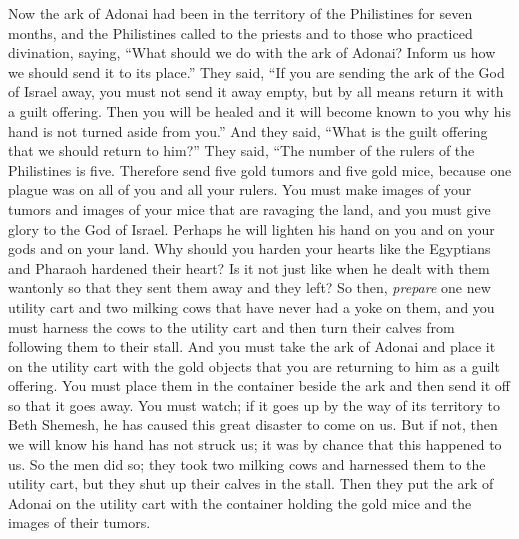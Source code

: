 \begin{biblechapter} %
 Now the ark of Adonai had been in the territory of the Philistines for seven months,
\verse and the Philistines called to the priests and to those who practiced divination, saying, “What should we do with the ark of Adonai? Inform us how we should send it to its place.”
\verse They said, “If you are sending the ark of the God of Israel away, you must not send it away empty, but by all means return it with a guilt offering. Then you will be healed and it will become known to you why his hand is not turned aside from you.”
\verse And they said, “What is the guilt offering that we should return to him?” They said, “The number of the rulers of the Philistines is five. Therefore send five gold tumors and five gold mice, because one plague was on all of you and all your rulers.
\verse You must make images of your tumors and images of your mice that are ravaging the land, and you must give glory to the God of Israel. Perhaps he will lighten his hand on you and on your gods and on your land.
\verse Why should you harden your hearts like the Egyptians and Pharaoh hardened their heart? Is it not just like when he dealt with them wantonly so that they sent them away and they left?
\verse So then, \textit{prepare} one new utility cart and two milking cows that have never had a yoke on them, and you must harness the cows to the utility cart and then turn their calves from following them to their stall.
\verse And you must take the ark of Adonai and place it on the utility cart with the gold objects that you are returning to him as a guilt offering. You must place them in the container beside the ark and then send it off so that it goes away.
\verse You must watch; if it goes up by the way of its territory to Beth Shemesh, he has caused this great disaster to come on us. But if not, then we will know his hand has not struck us; it was by chance that this happened to us.
\verse So the men did so; they took two milking cows and harnessed them to the utility cart, but they shut up their calves in the stall.
\verse Then they put the ark of Adonai on the utility cart with the container holding the gold mice and the images of their tumors.

\end{biblechapter}
